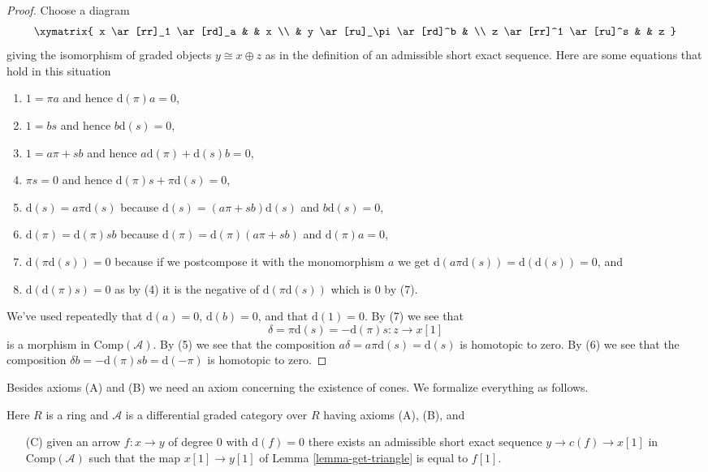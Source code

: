 \begin{proof}
Choose a diagram
$$
\xymatrix{
x \ar[rr]_1 \ar[rd]_a & & x \\
& y \ar[ru]_\pi \ar[rd]^b & \\
z \ar[rr]^1 \ar[ru]^s & & z
}
$$
giving the isomorphism of graded objects $y \cong x \oplus z$ as in the
definition of an admissible short exact sequence. Here are some equations
that hold in this situation
\begin{enumerate}
\item $1 = \pi a$ and hence $\text{d}(\pi) a = 0$,
\item $1 = b s$ and hence $b \text{d}(s) = 0$,
\item $1 = a \pi + s b$ and hence $a \text{d}(\pi) + \text{d}(s) b = 0$,
\item $\pi s = 0$ and hence $\text{d}(\pi)s + \pi \text{d}(s) = 0$,
\item $\text{d}(s) = a \pi \text{d}(s)$ because
$\text{d}(s) = (a \pi + s b)\text{d}(s)$ and $b\text{d}(s) = 0$,
\item $\text{d}(\pi) = \text{d}(\pi) s b$ because
$\text{d}(\pi) = \text{d}(\pi)(a \pi + s b)$ and $\text{d}(\pi)a = 0$,
\item $\text{d}(\pi \text{d}(s)) = 0$ because if we postcompose it
with the monomorphism $a$ we get
$\text{d}(a\pi \text{d}(s)) = \text{d}(\text{d}(s)) = 0$, and
\item $\text{d}(\text{d}(\pi)s) = 0$ as by (4) it is the negative
of $\text{d}(\pi\text{d}(s))$ which is $0$ by (7).
\end{enumerate}
We've used repeatedly that $\text{d}(a) = 0$, $\text{d}(b) = 0$,
and that $\text{d}(1) = 0$. By (7) we see that
$$
\delta = \pi \text{d}(s) = - \text{d}(\pi) s : z \to x[1]
$$
is a morphism in $\text{Comp}(\mathcal{A})$. By (5) we see that
the composition $a \delta = a \pi \text{d}(s) = \text{d}(s)$
is homotopic to zero. By (6) we see that the composition
$\delta b = - \text{d}(\pi)sb = \text{d}(-\pi)$ is homotopic to zero.
\end{proof}

\noindent
Besides axioms (A) and (B) we need an axiom concerning the existence of
cones. We formalize everything as follows.

\begin{situation}
\label{situation-ABC}
Here $R$ is a ring and $\mathcal{A}$ is a differential graded category
over $R$ having axioms (A), (B), and
\begin{enumerate}
\item[(C)] given an arrow $f : x \to y$ of degree $0$ with
$\text{d}(f) = 0$ there exists an admissible short exact sequence
$y \to c(f) \to x[1]$ in $\text{Comp}(\mathcal{A})$ such that the map
$x[1] \to y[1]$ of Lemma \ref{lemma-get-triangle} is equal to $f[1]$.
\end{enumerate}
\end{situation}

